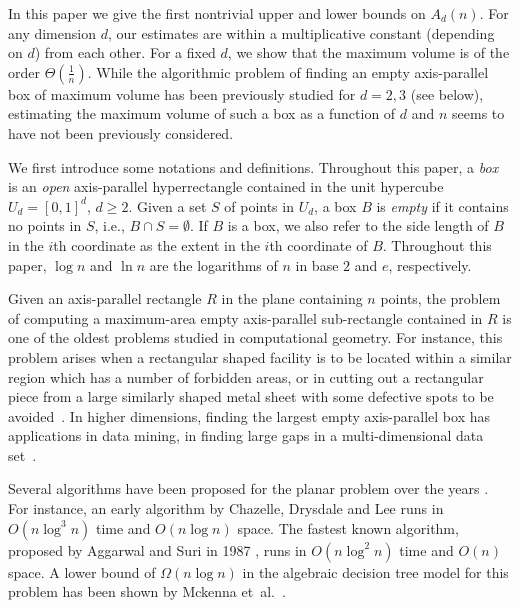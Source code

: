 \documentclass[11pt]{article}
\begin{document}
In this paper we give the first nontrivial upper and lower bounds on $A_d(n)$.
For any dimension $d$, our estimates are within a multiplicative
constant (depending on $d$) from each other. For a fixed $d$, we show
that the maximum volume is of the order $\Theta(\frac{1}{n})$.   
While the algorithmic problem of finding an empty axis-parallel box
of maximum volume has been previously studied for $d=2,3$ (see below),
estimating the maximum volume of such a box as a function of $d$ and
$n$ seems to have not been previously considered. 

We first introduce some notations and definitions. Throughout this paper,
a \emph{box} is an \emph{open} axis-parallel hyperrectangle
contained in the unit hypercube $U_d=[0,1]^d$, $d \ge 2$.
Given a set $S$ of points in $U_d$,
a box $B$ is \emph{empty} if it contains no points in $S$,
i.e., $B\cap S = \emptyset$.
If $B$ is a box, we also refer to the side length of $B$ in the $i$th
coordinate as the extent in the $i$th coordinate of $B$. 
Throughout this paper, $\log{n}$ and $\ln{n}$ are the logarithms of $n$ in
base $2$ and $e$, respectively.

Given an axis-parallel rectangle $R$ in the plane containing $n$ points,
the problem of computing a maximum-area empty axis-parallel
sub-rectangle contained in $R$ is one of the oldest problems studied 
in computational geometry. For instance, this problem arises 
when a rectangular shaped facility is to be located within a
similar region which has a number of forbidden areas, or in cutting
out a rectangular piece from a large similarly shaped metal sheet with
some defective spots to be avoided~\cite{NLH84}. In higher dimensions,
finding the largest empty axis-parallel box has applications
in data mining, in finding large gaps in a multi-dimensional data
set~\cite{EGLM03}. 

Several algorithms have been proposed for the planar problem
over the years \cite{AS87,AF86,AK89,CDL86,D92,MOS85,NLH84,O90}. 
For instance, an early algorithm by Chazelle, Drysdale and Lee
\cite{CDL86} runs in $O(n \log^3{n})$ time and $O(n \log{n})$ space.
The fastest known algorithm,
proposed by Aggarwal and Suri in 1987 \cite{AS87},
runs in $O(n \log^2{n})$ time and $O(n)$ space. 
A lower bound of $\Omega(n \log{n})$ in the algebraic decision tree
model for this problem has been shown by Mckenna et~al.\ \cite{MOS85}.
\end{document}

